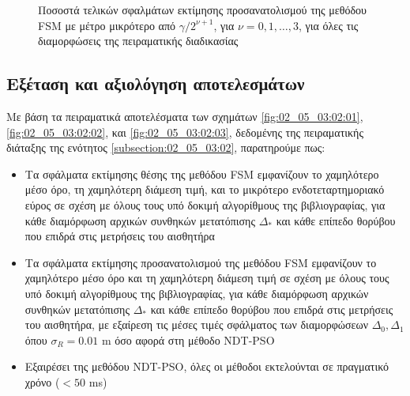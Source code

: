 \begin{figure}\centering\vspace{1cm}
  
  \vspace{-1.5cm}
  \caption{\small Ποσοστά τελικών σφαλμάτων εκτίμησης προσανατολισμού της
           μεθόδου FSM με μέτρο μικρότερο από $\gamma/2^{\nu+1}$, για
           $\nu = 0, 1, \dots, 3$, για όλες τις διαμορφώσεις της πειραματικής
           διαδικασίας}
  \label{fig:02_05_03:02:09}
\end{figure}

\subsection{Εξέταση και αξιολόγηση αποτελεσμάτων}
\label{subsection:02_05_03:03}

Με βάση τα πειραματικά αποτελέσματα των σχημάτων \ref{fig:02_05_03:02:01},
\ref{fig:02_05_03:02:02}, και \ref{fig:02_05_03:02:03}, δεδομένης της
πειραματικής διάταξης της ενότητος \ref{subsection:02_05_03:02}, παρατηρούμε
πως:

\begin{itemize}
  \item Τα σφάλματα εκτίμησης θέσης της μεθόδου FSM εμφανίζουν το χαμηλότερο
        μέσο όρο, τη χαμηλότερη διάμεση τιμή, και το μικρότερο
        ενδοτεταρτημοριακό εύρος σε σχέση με όλους τους υπό δοκιμή αλγορίθμους
        της βιβλιογραφίας, για κάθε διαμόρφωση αρχικών συνθηκών μετατόπισης
        $\Delta_\ast$ και κάθε επίπεδο θορύβου που επιδρά στις μετρήσεις του
        αισθητήρα
  \item Τα σφάλματα εκτίμησης προσανατολισμού της μεθόδου FSM εμφανίζουν το
        χαμηλότερο μέσο όρο και τη χαμηλότερη διάμεση τιμή σε σχέση με όλους
        τους υπό δοκιμή αλγορίθμους της βιβλιογραφίας, για κάθε διαμόρφωση
        αρχικών συνθηκών μετατόπισης $\Delta_\ast$ και κάθε επίπεδο θορύβου που
        επιδρά στις μετρήσεις του αισθητήρα, με εξαίρεση τις μέσες τιμές
        σφάλματος των διαμορφώσεων $\Delta_0,\Delta_1$ όπου $\sigma_R = 0.01$ m
        όσο αφορά στη μέθοδο NDT-PSO
  \item Εξαιρέσει της μεθόδου NDT-PSO, όλες οι μέθοδοι εκτελούνται σε πραγματικό
        χρόνο ($< 50$ ms)
\end{itemize}


